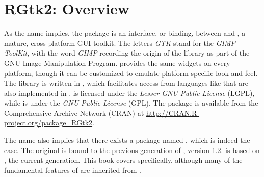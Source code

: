 




\chapter{RGtk2: Overview}
\label{sec:RGtk2-Introduction}


As the name implies, the  package is an interface, or
binding, between \R\/ and \GTK, a mature, cross-platform GUI
toolkit. The letters \emph{GTK} stand for the \emph{GIMP ToolKit},
with the word \emph{GIMP} recording the origin of the library as part
of the GNU Image Manipulation Program.  provides the same
widgets on every platform, though it can be customized to emulate
platform-specific look and feel. The library is written in
, which facilitates access from languages like
 that are also implemented in .  is
licensed under the \textit{Lesser GNU Public License} (LGPL), while
 is under the \textit{GNU Public License} (GPL).
The package is available from the Comprehensive  Archive
Network (CRAN) at \url{http://CRAN.R-project.org/package=RGtk2}.

The name  also implies that there exists a package named
, which is indeed the case. The original  is bound
to the previous generation of , version 1.2.  is
based on , the current generation. This book covers
 specifically, although many of the fundamental features of
 are inherited from . 

